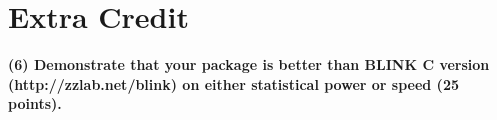\documentclass[
]{article}
\begin{document}
\hypertarget{extra-credit}{%
\section{Extra Credit}\label{extra-credit}}

\textbf{(6) Demonstrate that your package is better than BLINK C version (http://zzlab.net/blink) on either statistical power or speed (25 points). }
\end{document}
